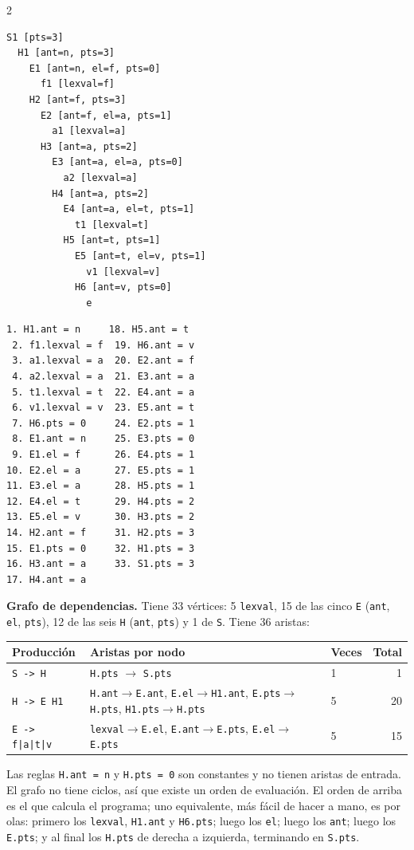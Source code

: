 \documentclass[11pt,a4paper]{article}
\newcommand{\code}[1]{\texttt{#1}}
\begin{document}
\begin{multicols}{2}
\begin{Verbatim}[fontsize=\footnotesize]
S1 [pts=3]
  H1 [ant=n, pts=3]
    E1 [ant=n, el=f, pts=0]
      f1 [lexval=f]
    H2 [ant=f, pts=3]
      E2 [ant=f, el=a, pts=1]
        a1 [lexval=a]
      H3 [ant=a, pts=2]
        E3 [ant=a, el=a, pts=0]
          a2 [lexval=a]
        H4 [ant=a, pts=2]
          E4 [ant=a, el=t, pts=1]
            t1 [lexval=t]
          H5 [ant=t, pts=1]
            E5 [ant=t, el=v, pts=1]
              v1 [lexval=v]
            H6 [ant=v, pts=0]
              e
\end{Verbatim}
\columnbreak
\begin{Verbatim}[fontsize=\footnotesize]
 1. H1.ant = n     18. H5.ant = t
 2. f1.lexval = f  19. H6.ant = v
 3. a1.lexval = a  20. E2.ant = f
 4. a2.lexval = a  21. E3.ant = a
 5. t1.lexval = t  22. E4.ant = a
 6. v1.lexval = v  23. E5.ant = t
 7. H6.pts = 0     24. E2.pts = 1
 8. E1.ant = n     25. E3.pts = 0
 9. E1.el = f      26. E4.pts = 1
10. E2.el = a      27. E5.pts = 1
11. E3.el = a      28. H5.pts = 1
12. E4.el = t      29. H4.pts = 2
13. E5.el = v      30. H3.pts = 2
14. H2.ant = f     31. H2.pts = 3
15. E1.pts = 0     32. H1.pts = 3
16. H3.ant = a     33. S1.pts = 3
17. H4.ant = a
\end{Verbatim}
\end{multicols}

\textbf{Grafo de dependencias.} Tiene 33 vértices: 5 \code{lexval}, 15 de las cinco \code{E} (\code{ant}, \code{el}, \code{pts}), 12 de las seis \code{H} (\code{ant}, \code{pts}) y 1 de \code{S}. Tiene 36 aristas:

\begin{center}
\begin{tabular}{@{}lllr@{}}
\toprule
Producción & Aristas por nodo & Veces & Total \\
\midrule
\code{S -> H} & \code{H.pts} $\to$ \code{S.pts} & 1 & 1 \\
\code{H -> E H1} & \code{H.ant}$\to$\code{E.ant}, \code{E.el}$\to$\code{H1.ant}, \code{E.pts}$\to$\code{H.pts}, \code{H1.pts}$\to$\code{H.pts} & 5 & 20 \\
\code{E -> f|a|t|v} & \code{lexval}$\to$\code{E.el}, \code{E.ant}$\to$\code{E.pts}, \code{E.el}$\to$\code{E.pts} & 5 & 15 \\
\bottomrule
\end{tabular}
\end{center}

Las reglas \code{H.ant = n} y \code{H.pts = 0} son constantes y no tienen aristas de entrada. El grafo no tiene ciclos, así que existe un orden de evaluación. El orden de arriba es el que calcula el programa; uno equivalente, más fácil de hacer a mano, es por olas: primero los \code{lexval}, \code{H1.ant} y \code{H6.pts}; luego los \code{el}; luego los \code{ant}; luego los \code{E.pts}; y al final los \code{H.pts} de derecha a izquierda, terminando en \code{S.pts}.
\end{document}
